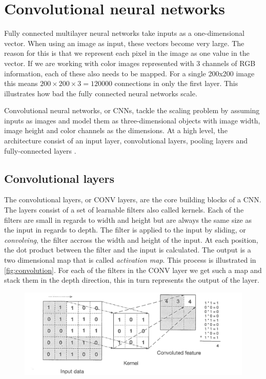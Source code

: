 \section{Convolutional neural networks}
Fully connected multilayer neural networks take inputs as a one-dimensional vector. When using an image as input, these vectors become very large. The reason for this is that we represent each pixel in the image as one value in the vector. If we are working with color images represented with 3 channels of RGB information, each of these also needs to be mapped. For a single 200x200 image this means $200 \times 200 \times 3 = 120000$ connections in only the first layer. This illustrates how bad the fully connected neural networks scale.

Convolutional neural networks, or CNNs, tackle the scaling problem by assuming inputs as images and model them as three-dimensional objects with image width, image height and color channels as the dimensions. At a high level, the architecture consist of an input layer, convolutional layers, pooling layers and fully-connected layers \cite{Patterson2017}. 

\subsection{Convolutional layers}
The convolutional layers, or CONV layers, are the core building blocks of a CNN. The layers consist of a set of learnable filters also called kernels. Each of the filters are small in regards to width and height but are always the same size as the input in regards to depth. The filter is applied to the input by sliding, or \emph{convolving}, the filter accross the width and height of the input. At each position, the dot product between the filter and the input is calculated. The output is a two dimensional map that is called \emph{activation map}. This process is illustrated in \autoref{fig:convolution}. For each of the filters in the CONV layer we get such a map and stack them in the depth direction, this in turn represents the output of the layer. 

\begin{figure}[H]
	\centering
	\includegraphics[width=\linewidth]{fig/convolution.png}
	\label{fig:convolution}
\end{figure}

